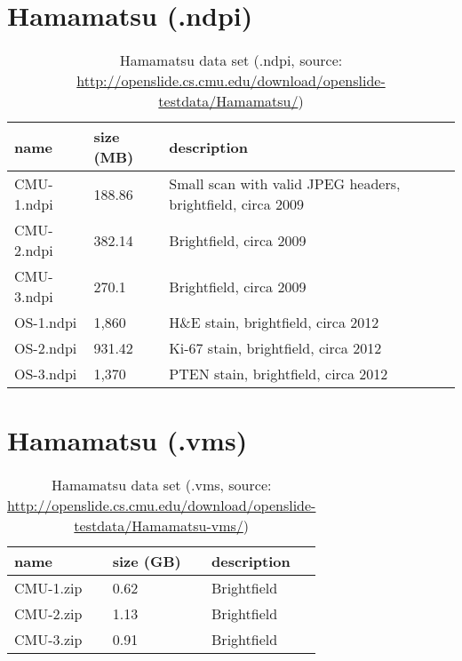 \section{Hamamatsu (.ndpi)}

\begin{table}[H]
	\begin{center}
		\begin{tabular}{| p{4cm} | p{2cm} | p{5cm} |}
			\hline
			\textbf{name} & \textbf{size (MB)} & \textbf{description} \\ \hline
			CMU-1.ndpi & 188.86 & Small scan with valid JPEG headers, brightfield, circa 2009 \\ \hline
			CMU-2.ndpi & 382.14 & Brightfield, circa 2009 \\ \hline
			CMU-3.ndpi & 270.1 & Brightfield, circa 2009 \\ \hline
			OS-1.ndpi & 1,860 & H\&E stain, brightfield, circa 2012 \\ \hline
			OS-2.ndpi & 931.42 & Ki-67 stain, brightfield, circa 2012 \\ \hline
			OS-3.ndpi & 1,370 & PTEN stain, brightfield, circa 2012 \\ \hline
		\end{tabular}
		\caption{Hamamatsu data set (.ndpi, source: \url{http://openslide.cs.cmu.edu/download/openslide-testdata/Hamamatsu/})}
	\end{center}
\end{table}


\section{Hamamatsu (.vms)}

\begin{table}[H]
	\begin{center}
		\begin{tabular}{| p{4cm} | p{2cm} | p{5cm} |}
			\hline
			\textbf{name} & \textbf{size (GB)} & \textbf{description} \\ \hline
			CMU-1.zip & 0.62 & Brightfield \\ \hline
			CMU-2.zip & 1.13 & Brightfield \\ \hline
			CMU-3.zip & 0.91 & Brightfield \\ \hline
		\end{tabular}
		\caption{Hamamatsu data set (.vms, source: \url{http://openslide.cs.cmu.edu/download/openslide-testdata/Hamamatsu-vms/})}
	\end{center}
\end{table}


